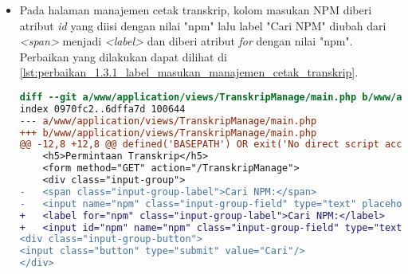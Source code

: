 \begin{itemize}
\begin{lstlisting}[frame=single, label={lst:perbaikan_1.3.1_tag_heading}, language=diff, caption=Perbaikan Kriteria Sukses 1.3.1 - Penggunaan \textit{Heading} Tidak Tepat]
    <div class="callout">
-   <h5>Permohonan Baru</h5>
+   <h1>Permohonan Baru</h1>
    <?php if (is_array($forbiddenTypes)): ?>
    <form method="POST" action="/TranskripRequest/add">
    <input type="hidden" name="<?= $this->security->get_csrf_token_name() ?>" value="<?= $this->security->get_csrf_hash() ?>" />
@@ -57,7 +57,7 @@ defined('BASEPATH') OR exit('No direct script access allowed');
    <?php endif ?>
    </div>
    <div class="callout">
-   <h5>Histori Permohonan</h5>
+   <h1>Histori Permohonan</h1>
    <table class="stack">
    <thead>
    <tr>
@@ -81,7 +81,7 @@ defined('BASEPATH') OR exit('No direct script access allowed');
    <td><?= $request->answeredMessage ?></td>
    <td>
    <div class="reveal" id="detail<?= $request->id ?>" data-reveal>
-   <h5>Detail Permohonan #<?= $request->id ?></h5>
+   <h2>Detail Permohonan #<?= $request->id ?></h2>
    <table class="stack">
    <tbody>
    <tr>
\end{lstlisting}

\item Pada halaman manajemen cetak transkrip, kolom masukan NPM diberi atribut \textit{id} yang diisi dengan nilai "npm" lalu label "Cari NPM" diubah dari \textit{<span>} menjadi \textit{<label>} dan diberi atribut \textit{for} dengan nilai "npm". Perbaikan yang dilakukan dapat dilihat di \ref{lst:perbaikan_1.3.1_label_masukan_manajemen_cetak_transkrip}.
\begin{lstlisting}[frame=single, label={lst:perbaikan_1.3.1_label_masukan_manajemen_cetak_transkrip}, language=diff, caption=Perbaikan Kriteria Sukses 1.3.1 - Tidak Terdapat Label pada Kolom Masukan di Halaman Manajemen Cetak Transkrip]
diff --git a/www/application/views/TranskripManage/main.php b/www/application/views/TranskripManage/main.php
index 0970fc2..6dffa7d 100644
--- a/www/application/views/TranskripManage/main.php
+++ b/www/application/views/TranskripManage/main.php
@@ -12,8 +12,8 @@ defined('BASEPATH') OR exit('No direct script access allowed');
    <h5>Permintaan Transkrip</h5>
    <form method="GET" action="/TranskripManage">
    <div class="input-group">
-   <span class="input-group-label">Cari NPM:</span>
-   <input name="npm" class="input-group-field" type="text" placeholder="2013730013" maxlength="10" minlength="10"<?= $npmQuery === NULL ? '' : " value='$npmQuery'" ?>/>
+   <label for="npm" class="input-group-label">Cari NPM:</label>
+   <input id="npm" name="npm" class="input-group-field" type="text" placeholder="2013730013" maxlength="10" minlength="10"<?= $npmQuery === NULL ? '' : " value='$npmQuery'" ?>/>
<div class="input-group-button">
<input class="button" type="submit" value="Cari"/>
</div>
\end{lstlisting}


\end{itemize}
